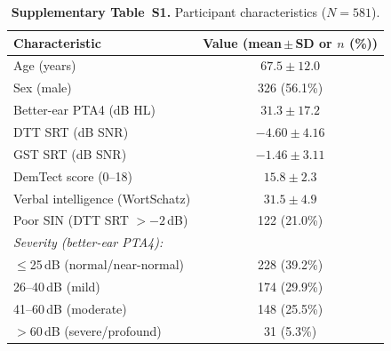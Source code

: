 \documentclass[12pt,a4paper]{article}
\begin{document}
\begin{table}[htbp]
\caption{\textbf{Supplementary Table~S1.} Participant characteristics
($N=581$).}
\label{tab:demo_supp}
\centering\small
\begin{tabular}{lc}
\toprule
Characteristic & Value (mean\,$\pm$\,SD or $n$ (\%)) \\
\midrule
Age (years)                    & $67.5 \pm 12.0$ \\
Sex (male)                     & 326 (56.1\%) \\
Better-ear PTA4 (dB HL)        & $31.3 \pm 17.2$ \\
DTT SRT (dB SNR)               & $-4.60 \pm 4.16$ \\
GST SRT (dB SNR)               & $-1.46 \pm 3.11$ \\
DemTect score (0--18)          & $15.8 \pm 2.3$ \\
Verbal intelligence (WortSchatz) & $31.5 \pm 4.9$ \\
Poor SIN (DTT SRT $>-2$\,dB)  & 122 (21.0\%) \\
\midrule
\multicolumn{2}{l}{\textit{Severity (better-ear PTA4):}} \\
$\leq$25\,dB (normal/near-normal) & 228 (39.2\%) \\
26--40\,dB (mild)              & 174 (29.9\%) \\
41--60\,dB (moderate)          & 148 (25.5\%) \\
$>$60\,dB (severe/profound)    & 31 (5.3\%) \\
\bottomrule
\end{tabular}
\end{table}
\end{document}
